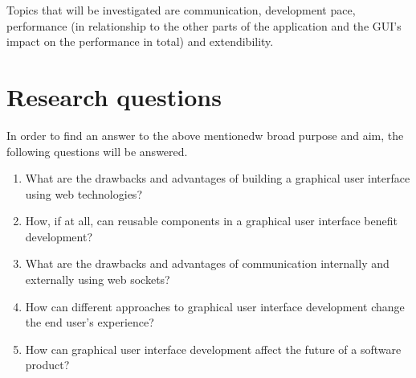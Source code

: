 Topics that will be investigated are communication, development pace, performance (in relationship to the other parts of the application and the GUI's impact on the performance in total) and extendibility.



\section{Research questions}
\label{sec:research-questions}



In order to find an answer to the above mentionedw broad purpose and aim, the following questions will be answered.

\begin{enumerate}
  \item What are the drawbacks and advantages of building a graphical user interface using web technologies? \label{q:drawbacks}
  \item How, if at all, can reusable components in a graphical user interface benefit development? \label{q:reuse}
  \item What are the drawbacks and advantages of communication internally and externally using web sockets? \label{q:websocket}
  \item How can different approaches to graphical user interface development change the end user's experience? \label{q:approach}
  \item How can graphical user interface development affect the future of a software product? \label{q:future}
\end{enumerate}


